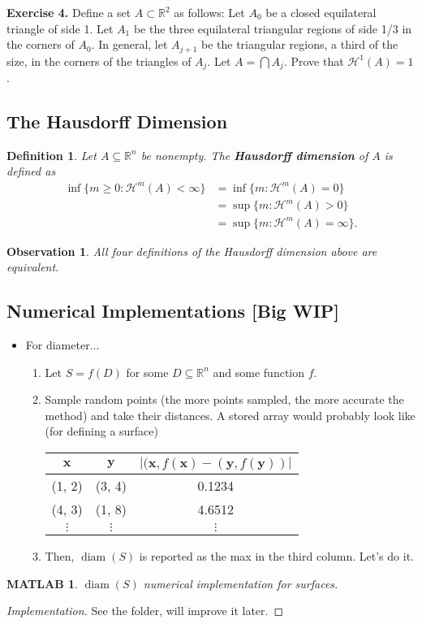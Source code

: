 \documentclass[10pt]{article}
\theoremstyle{plain}
\newtheorem{definition}{Definition}
\newtheorem{observation}{Observation}
\newtheorem{matlab}{MATLAB}
\DeclareMathOperator{\diam}{diam}
\begin{document}
	\noindent \textbf{Exercise 4.} Define a set $A \subset \mathbb{R}^2$ as follows: Let $A_0$ be a closed equilateral triangle of side 1. Let $A_1$ be the three equilateral triangular regions of side 1/3 in the corners of $A_0$. In general, let $A_{j + 1}$ be the triangular regions, a third of the size, in the corners of the triangles of $A_j$. Let $A = \bigcap A_j$. Prove that $\mathcal{H}^1(A) = 1$. 

\newpage 
\subsection*{The Hausdorff Dimension}
\newpage 


	\begin{definition}
		Let $A \subseteq \mathbb{R}^n$ be nonempty. The \textbf{\textit{Hausdorff dimension}} of $A$ is defined as 
			\begin{align*}
				\inf\{m \geq 0 : \mathcal{H}^m(A) < \infty\} &= \inf \{m : \mathcal{H}^m(A) = 0\} \\ 
				&= \sup \{m : \mathcal{H}^m(A) > 0\} \\
				&= \sup \{m : \mathcal{H}^m(A) = \infty\}.
			\end{align*}
	\end{definition}


	\begin{observation}
		All four definitions of the Hausdorff dimension above are equivalent.
	\end{observation}

\subsection*{Numerical Implementations [Big WIP]}
	\begin{itemize}
		\item For diameter...
			\begin{enumerate}
				\item Let $S = f(D)$ for some $D \subseteq \mathbb{R}^n$ and some function $f$. 
				
				\item Sample random points (the more points sampled, the more accurate the method) and take their distances. A stored array would probably look like (for defining a surface)
					
					\begin{table}[H]
						\centering 
						\begin{tabular}{c|c|c}
							$\mathbf{x}$ & $\mathbf{y}$ & $|(\mathbf{x}, f(\mathbf{x}) - (\mathbf{y}, f(\mathbf{y}))|$ \\
							\hline  
							(1, 2) & (3, 4) & 0.1234 \\
							(4, 3) & (1, 8) & 4.6512 \\
							$\vdots$ & $\vdots$ & $\vdots$ 
						\end{tabular}						
					\end{table}
				
				\item Then, $\diam(S)$ is reported as the max in the third column. Let's do it.
			\end{enumerate}
	\end{itemize}

	\begin{matlab}
		$\diam(S)$ numerical implementation for surfaces. 
	\end{matlab}
		\begin{proof}[Implementation]
			See the folder, will improve it later. 
		\end{proof}
\end{document}
